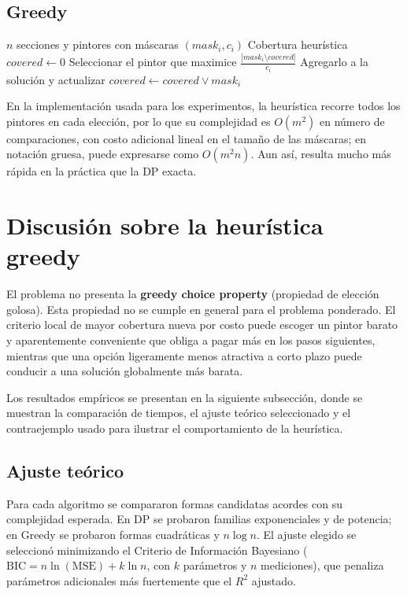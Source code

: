 \documentclass[11pt]{article}
\begin{document}
\subsection{Greedy}
\begin{algorithm}[H]
\caption{Heurística greedy por cobertura nueva/costo}
\begin{algorithmic}[1]
\Require $n$ secciones y pintores con máscaras $(mask_i, c_i)$
\Ensure Cobertura heurística
\State $covered \leftarrow 0$
    \State Seleccionar el pintor que maximice $\frac{|mask_i \setminus covered|}{c_i}$
    \State Agregarlo a la solución y actualizar $covered \leftarrow covered \lor mask_i$
\EndWhile
\end{algorithmic}
\end{algorithm}

En la implementación usada para los experimentos, la heurística recorre todos los pintores en cada elección, por lo que su complejidad es $O(m^2)$ en número de comparaciones, con costo adicional lineal en el tamaño de las máscaras; en notación gruesa, puede expresarse como $O(m^2 n)$. Aun así, resulta mucho más rápida en la práctica que la DP exacta.

\section{Discusión sobre la heurística greedy}
El problema no presenta la \textbf{greedy choice property} (propiedad de elección golosa). Esta propiedad no se cumple en general para el problema ponderado. El criterio local de mayor cobertura nueva por costo puede escoger un pintor barato y aparentemente conveniente que obliga a pagar más en los pasos siguientes, mientras que una opción ligeramente menos atractiva a corto plazo puede conducir a una solución globalmente más barata.

Los resultados empíricos se presentan en la siguiente subsección, donde se muestran la comparación de tiempos, el ajuste teórico seleccionado y el contraejemplo usado para ilustrar el comportamiento de la heurística.

\subsection{Ajuste teórico}
Para cada algoritmo se compararon formas candidatas acordes con su complejidad esperada. En DP se probaron familias exponenciales y de potencia; en Greedy se probaron formas cuadráticas y $n\log n$. El ajuste elegido se seleccionó minimizando el Criterio de Información Bayesiano ($\text{BIC} = n\ln(\text{MSE}) + k\ln n$, con $k$ parámetros y $n$ mediciones), que penaliza parámetros adicionales más fuertemente que el $R^2$ ajustado.
\end{document}
